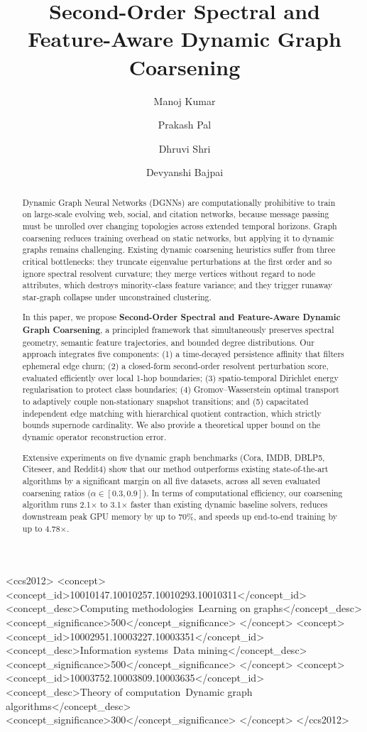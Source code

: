 \documentclass[sigconf]{acmart}
\author{Manoj Kumar}
\affiliation{%
  \institution{Indian Institute of Technology Roorkee}
  \city{Roorkee}
  \state{Uttarakhand}
  \country{India}
}
\author{Prakash Pal}
\affiliation{%
  \institution{Indian Institute of Technology (ISM) Dhanbad}
  \city{Dhanbad}
  \state{Jharkhand}
  \country{India}
}
\author{Dhruvi Shri}
\affiliation{%
  \institution{Pranveer Singh Institute of Technology}
  \city{Kanpur}
  \state{Uttar Pradesh}
  \country{India}
}
\author{Devyanshi Bajpai}
\affiliation{%
  \institution{Pranveer Singh Institute of Technology}
  \city{Kanpur}
  \state{Uttar Pradesh}
  \country{India}
}
\begin{document}
\title[Second-Order Spectral and Feature-Aware Dynamic Graph Coarsening]{Second-Order Spectral and Feature-Aware Dynamic Graph Coarsening}

\begin{abstract}
Dynamic Graph Neural Networks (DGNNs) are computationally prohibitive to train on large-scale evolving web, social, and citation networks, because message passing must be unrolled over changing topologies across extended temporal horizons. Graph coarsening reduces training overhead on static networks, but applying it to dynamic graphs remains challenging. Existing dynamic coarsening heuristics suffer from three critical bottlenecks: they truncate eigenvalue perturbations at the first order and so ignore spectral resolvent curvature; they merge vertices without regard to node attributes, which destroys minority-class feature variance; and they trigger runaway star-graph collapse under unconstrained clustering.

In this paper, we propose \textbf{Second-Order Spectral and Feature-Aware Dynamic Graph Coarsening}, a principled framework that simultaneously preserves spectral geometry, semantic feature trajectories, and bounded degree distributions. Our approach integrates five components: (1) a time-decayed persistence affinity that filters ephemeral edge churn; (2) a closed-form second-order resolvent perturbation score, evaluated efficiently over local 1-hop boundaries; (3) spatio-temporal Dirichlet energy regularisation to protect class boundaries; (4) Gromov--Wasserstein optimal transport to adaptively couple non-stationary snapshot transitions; and (5) capacitated independent edge matching with hierarchical quotient contraction, which strictly bounds supernode cardinality. We also provide a theoretical upper bound on the dynamic operator reconstruction error.

Extensive experiments on five dynamic graph benchmarks (Cora, IMDB, DBLP5, Citeseer, and Reddit4) show that our method outperforms existing state-of-the-art algorithms by a significant margin on all five datasets, across all seven evaluated coarsening ratios ($\alpha \in [0.3, 0.9]$). In terms of computational efficiency, our coarsening algorithm runs 2.1$\times$ to 3.1$\times$ faster than existing dynamic baseline solvers, reduces downstream peak GPU memory by up to 70\%, and speeds up end-to-end training by up to 4.78$\times$.
\end{abstract}

\begin{CCSXML}
<ccs2012>
 <concept>
  <concept_id>10010147.10010257.10010293.10010311</concept_id>
  <concept_desc>Computing methodologies~Learning on graphs</concept_desc>
  <concept_significance>500</concept_significance>
 </concept>
 <concept>
  <concept_id>10002951.10003227.10003351</concept_id>
  <concept_desc>Information systems~Data mining</concept_desc>
  <concept_significance>500</concept_significance>
 </concept>
 <concept>
  <concept_id>10003752.10003809.10003635</concept_id>
  <concept_desc>Theory of computation~Dynamic graph algorithms</concept_desc>
  <concept_significance>300</concept_significance>
 </concept>
</ccs2012>
\end{CCSXML}
\end{document}
